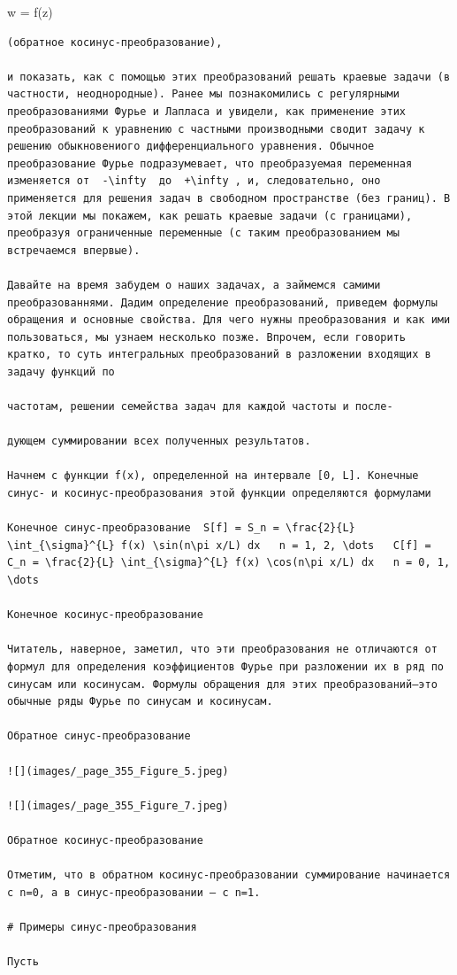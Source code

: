\documentclass[
  ukrainian,
]{article}
\begin{document}
w = f(z)

\begin{verbatim}
(обратное косинус-преобразование),

и показать, как с помощью этих преобразований решать краевые задачи (в частности, неоднородные). Ранее мы познакомились с регулярными преобразованиями Фурье и Лапласа и увидели, как применение этих преобразований к уравнению с частными производными сводит задачу к решению обыкновениого дифференциального уравнения. Обычное преобразование Фурье подразумевает, что преобразуемая переменная изменяется от  -\infty  до  +\infty , и, следовательно, оно применяется для решения задач в свободном пространстве (без границ). В этой лекции мы покажем, как решать краевые задачи (с границами), преобразуя ограниченные переменные (с таким преобразованием мы встречаемся впервые).

Давайте на время забудем о наших задачах, а займемся самими преобразованнями. Дадим определение преобразований, приведем формулы обращения и основные свойства. Для чего нужны преобразования и как ими пользоваться, мы узнаем несколько позже. Впрочем, если говорить кратко, то суть интегральных преобразований в разложении входящих в задачу функций по

частотам, решении семейства задач для каждой частоты и после-

дующем суммировании всех полученных результатов.

Начнем с функции f(x), определенной на интервале [0, L]. Конечные синус- и косинус-преобразования этой функции определяются формулами

Конечное синус-преобразование  S[f] = S_n = \frac{2}{L} \int_{\sigma}^{L} f(x) \sin(n\pi x/L) dx   n = 1, 2, \dots   C[f] = C_n = \frac{2}{L} \int_{\sigma}^{L} f(x) \cos(n\pi x/L) dx   n = 0, 1, \dots 

Конечное косинус-преобразование

Читатель, наверное, заметил, что эти преобразования не отличаются от формул для определения коэффициентов Фурье при разложении их в ряд по синусам или косинусам. Формулы обращения для этих преобразований—это обычные ряды Фурье по синусам и косинусам.

Обратное синус-преобразование

![](images/_page_355_Figure_5.jpeg)

![](images/_page_355_Figure_7.jpeg)

Обратное косинус-преобразование

Отметим, что в обратном косинус-преобразовании суммирование начинается с n=0, а в синус-преобразовании — с n=1.

# Примеры синус-преобразования

Пусть
\end{verbatim}
\end{document}
